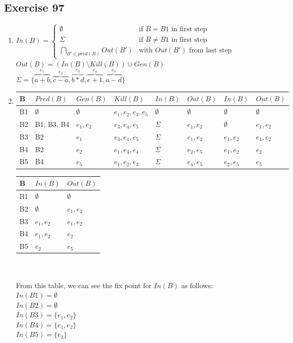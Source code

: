 \documentclass[12pt,fleqn]{article}		%
\begin{document}
\subsection{Exercise 97}
\begin{enumerate}
\item $ In(B) = 
\begin{cases} 
\emptyset & \text{if } B=B1 \text{ in first step}\\
\Sigma & \text{if } B\not= B1 \text{ in first step}\\
\bigcap_{B' \in pred(B)} Out(B') & \text{with } Out(B') \text{ from last step}
\end{cases}$\\
$Out(B) = (In(B) \setminus Kill(B)) \cup Gen(B)$\\
$\Sigma = \{\overbrace{a+b}^{e_1}, \overbrace{c-a}^{e_2}, \overbrace{b*d}^{e_3}, \overbrace{e+1}^{e_4}, \overbrace{a-d}^{e_5}\}$
\item 
\begin{tabularx}{\textwidth}{| l | X | X | X || X | X || X | X ||}
\hline
B & $Pred(B) $ & $Gen(B)$ & $Kill(B)$ & $In(B)$ & $Out(B)$ & $In(B)$ & $Out(B)$\\
\hline
B1 & $\emptyset$ & $\emptyset$ & $e_1, e_2, e_3, e_5$ & $\emptyset$ & $\emptyset$ & $\emptyset$ & $\emptyset$ \\
\hline
B2 & B1, B3, B4 & $e_1, e_2$ & $e_3, e_4, e_5$ & $\Sigma$ & $e_1, e_2$ & $\emptyset$ & $e_1, e_2$\\
\hline
B3 & B2 & $e_1$ & $e_3, e_4, e_5$ & $\Sigma$ & $e_1, e_2$ & $e_1, e_2$ & $e_1, e_2$\\
\hline
B4 & B2 & $e_2$ & $e_1, e_3, e_4$ & $\Sigma$ & $e_2, e_5$ & $e_1, e_2$ & $e_2$\\
\hline
B5 & B4 & $e_5$ & $e_1, e_2, e_3$ & $\Sigma$ & $e_4, e_5$ & $e_2, e_5$ & $e_5$\\
\hline
\end{tabularx}
\begin{tabularx}{\textwidth}{| l || X | X ||}
\hline
B & $In(B)$ & $Out(B)$\\
\hline
B1 & $\emptyset$ & $\emptyset$\\
\hline
B2 & $\emptyset$ & $e_1, e_2$\\
\hline
B3 & $e_1, e_2$ & $e_1, e_2$\\
\hline
B4 & $e_1, e_2$ & $e_2$\\
\hline
B5 & $e_2$ & $e_5$\\
\hline
\end{tabularx}
\\\\
From this table, we can see the fix point for $In(B)$ as follows:\\
$In(B1) = \emptyset$\\
$In(B2) = \emptyset$\\
$In(B3) = \{e_1, e_2\}$\\
$In(B4) = \{e_1, e_2\}$\\
$In(B5) = \{e_2\}$


\end{enumerate}
\end{document}
